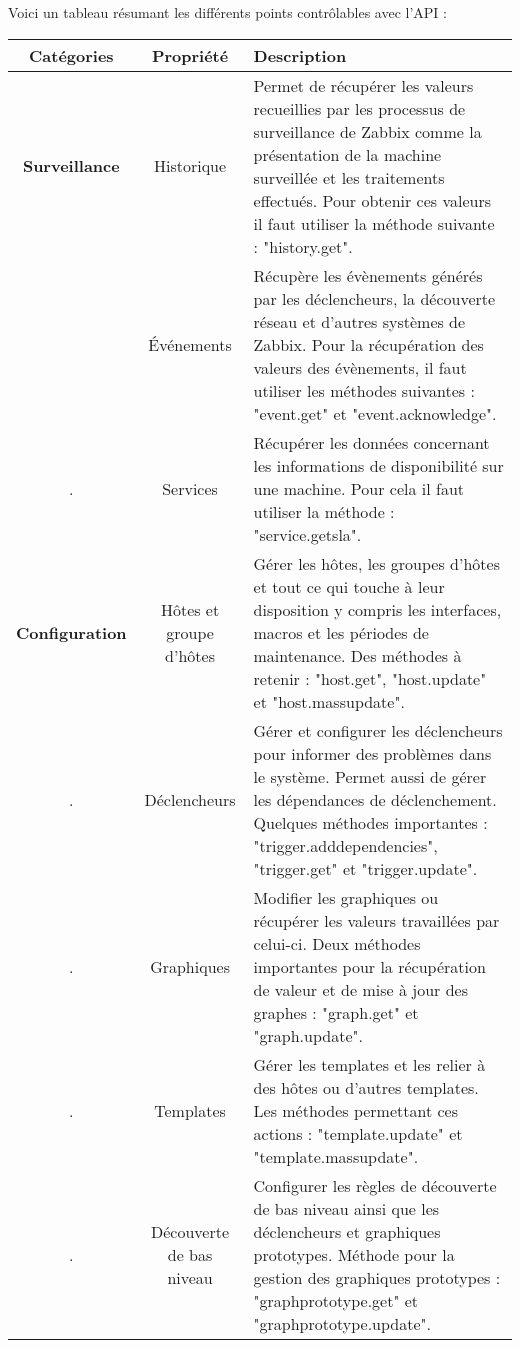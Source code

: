 	Voici un tableau résumant les différents points contrôlables avec l'API :

		\begin{tabular}{|c|c|m{9cm}|}
\hline
\bf Catégories & \bf Propriété & \bf Description \\

\hline
\bf Surveillance & Historique & Permet de récupérer les valeurs recueillies par les processus de surveillance de Zabbix comme la présentation de la machine surveillée et les traitements effectués. Pour obtenir ces valeurs il faut utiliser la méthode suivante : "history.get". \\

\hline
 & Événements & Récupère les évènements générés par les déclencheurs, la découverte réseau et d'autres systèmes de Zabbix. Pour la récupération des valeurs des évènements, il faut utiliser les méthodes suivantes : "event.get" et "event.acknowledge".\\

\hline
. & Services & Récupérer les données concernant les informations de disponibilité sur une machine. Pour cela il faut utiliser la méthode : "service.getsla".\\

\hline
\bf Configuration & Hôtes et groupe d'hôtes & Gérer les hôtes, les groupes d'hôtes et tout ce qui touche à leur disposition y compris les interfaces, macros et les périodes de maintenance. Des méthodes à retenir : "host.get", "host.update" et "host.massupdate". \\

\hline
. & Déclencheurs & Gérer et configurer les déclencheurs pour informer des problèmes dans le système. Permet aussi de gérer les dépendances de déclenchement. Quelques méthodes importantes : "trigger.adddependencies", "trigger.get" et "trigger.update". \\

\hline
. & Graphiques & Modifier les graphiques ou récupérer les valeurs travaillées par celui-ci. Deux méthodes importantes pour la récupération de valeur et de mise à jour des graphes : "graph.get" et "graph.update".\\

\hline
. & Templates & Gérer les templates et les relier à des hôtes ou d'autres templates. Les méthodes permettant ces actions : "template.update" et "template.massupdate".\\

\hline
. & Découverte de bas niveau & Configurer les règles de découverte de bas niveau ainsi que les déclencheurs et graphiques prototypes. Méthode pour la gestion des graphiques prototypes : "graphprototype.get" et "graphprototype.update".\\


\end{tabular}
